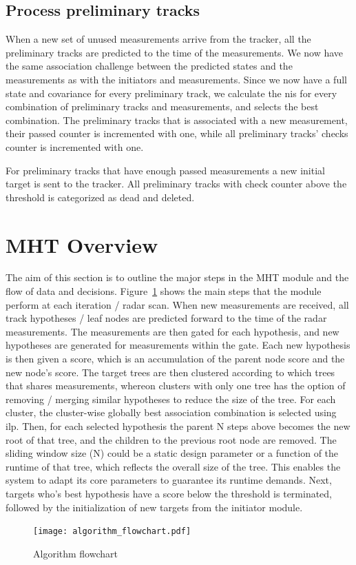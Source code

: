 \subsection{Process preliminary tracks}
When a new set of unused measurements arrive from the tracker, all the preliminary tracks are predicted to the time of the measurements. We now have the same association challenge between the predicted states and the measurements as with the initiators and measurements. Since we now have a full state and covariance for every preliminary track, we calculate the \gls{nis} for every combination of preliminary tracks and measurements, and selects the best combination. The preliminary tracks that is associated with a new measurement, their passed counter is incremented with one, while all preliminary tracks' checks counter is incremented with one. 

For preliminary tracks that have enough passed measurements a new initial target is sent to the tracker. All preliminary tracks with check counter above the threshold is categorized as dead and deleted. 

\section{MHT Overview}
The aim of this section is to outline the major steps in the MHT module and the flow of data and decisions. Figure~\ref{fig:algorithm_flow} shows the main steps that the module perform at each iteration / radar scan. When new measurements are received, all track hypotheses / leaf nodes are predicted forward to the time of the radar measurements. The measurements are then gated for each hypothesis, and new hypotheses are generated for measurements within the gate. Each new hypothesis is then given a score, which is an accumulation of the parent node score and the new node's score. The target trees are then clustered according to which trees that shares measurements, whereon clusters with only one tree has the option of removing / merging similar hypotheses to reduce the size of the tree. For each cluster, the cluster-wise globally best association combination is selected using \gls{ilp}. Then, for each selected hypothesis the parent N steps above becomes the new root of that tree, and the children to the previous root node are removed. The sliding window size (N) could be a static design parameter or a function of the runtime of that tree, which reflects the overall size of the tree. This enables the system to adapt its core parameters to guarantee its runtime demands. Next, targets who's  best hypothesis have a score below the threshold is terminated, followed by the initialization of new targets from the initiator module. 
\begin{figure}[H]
\centering
\texttt{[image: algorithm\_flowchart.pdf]}
\caption{Algorithm flowchart}\label{fig:algorithm_flow}
\end{figure}

